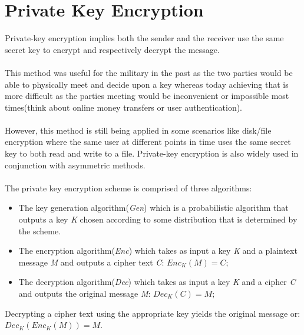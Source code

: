 \section{Private Key Encryption}

    Private-key encryption implies both the sender and the receiver use the same secret key to encrypt and respectively decrypt the message.\\
    \\
    This method was useful for the military in the past as the two parties would be able to physically meet and decide upon a key whereas today achieving that is more difficult as the parties meeting would be inconvenient or impossible most times(think about online money transfers or user authentication).\\
    \\
    However, this method is still being applied in some scenarios like disk/file encryption where the same user at different points in time uses the same secret key to both read and write to a file. Private-key encryption is also widely used in conjunction with asymmetric methods.\\
    \\
    The private key encryption scheme is comprised of three algorithms:
    
    \begin{itemize}
      \item The key generation algorithm(\textit{Gen}) which is a probabilistic algorithm that outputs a key \textit{K} chosen according to some distribution that is determined by the scheme.
      \item The encryption algorithm(\textit{Enc}) which takes as input a key \textit{K} and a plaintext message \textit{M} and outputs a cipher text \textit{C}: \begin{math}Enc_K(M) = C;\end{math}
      \item The decryption algorithm(\textit{Dec}) which takes as input a key \textit{K} and a cipher \textit{C} and outputs the original message \textit{M}: \begin{math}Dec_K(C) = M;\end{math}
    \end{itemize}
    
    Decrypting a cipher text using the appropriate key yields the original message or: $Dec_K(Enc_K(M))=M$.
    \\
    
